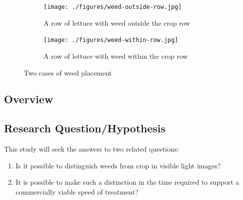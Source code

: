 \documentclass[letterpaper]{article}
\begin{document}
{\begin{figure}[H]
	\centering
	\begin{subfigure}[]{.40\textwidth}
		\texttt{[image: ./figures/weed-outside-row.jpg]}
		\caption{A row of lettuce with weed outside the crop row}
		\label{fig:lettuce-row-with-weed-outside}
	\end{subfigure}
	\begin{subfigure}{.40\textwidth}
		\centering
		\texttt{[image: ./figures/weed-within-row.jpg]}
		\caption{A row of lettuce with weed within the crop row}
		\label{fig:lettuce-row-with-weed-inside}
	\end{subfigure}
	\caption[Two cases of weed placement]{Two cases of weed placement}
	\label{fig:weed-placement}
\end{figure}


\subsection{Overview}

\subsection{Research Question/Hypothesis}
This study will seek the answers to two related questions:
\begin{enumerate}
\item{Is it possible to distinguish weeds from crop in visible light images?}
\item{It is possible to make such a distinction in the time required to support a commercially viable speed of treatment?}
\end{enumerate}

}
\end{document}
